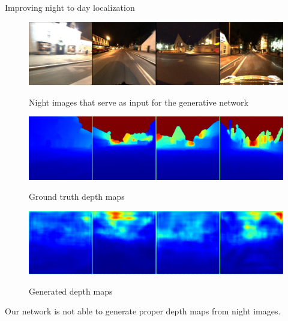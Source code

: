 \begin{frame}{Improving night to day localization}
	\begin{figure}
		\centering
		\begin{minipage}{0.6\linewidth}
			\includegraphics[width=0.9\linewidth]{im/res/night_input}
		\end{minipage}
		\begin{minipage}{0.35\linewidth}
			{Night images that serve as input for the generative network}
		\end{minipage}
	\end{figure}
	\vspace{-0.5cm}
	\begin{figure}
		\centering
		\begin{minipage}{0.6\linewidth}
			\includegraphics[width=0.9\linewidth]{im/res/night_gt}
		\end{minipage}
		\begin{minipage}{0.35\linewidth}
			\raggedright		
			{Ground truth depth maps}
		\end{minipage}
	\end{figure}	
	\vspace{-0.5cm}
	\begin{figure}
		\centering
		\begin{minipage}{0.6\linewidth}
			\includegraphics[width=0.9\linewidth]{im/res/night_noft}
		\end{minipage}
		\begin{minipage}{0.35\linewidth}
			\raggedright		
			{Generated depth maps}
		\end{minipage}
	\end{figure}
	\vfill

	Our network is not able to generate proper depth maps from night images.

\end{frame}

